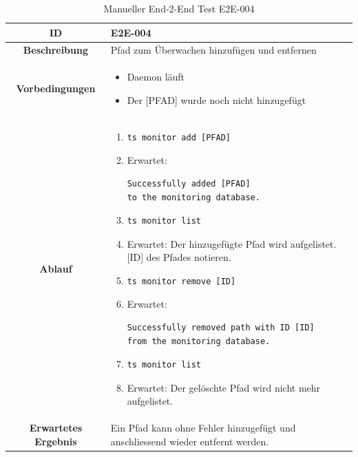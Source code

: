 \documentclass[a4paper,12pt]{report}
\begin{document}
    \begin{table}[h!]
        \centering
        \setlength{\leftmargini}{0.8cm}
        \begin{tabular}{|c|p{10cm}|}
            \hline
            \textbf{ID}                  & E2E-004                                                                         \\ \hline
            \textbf{Beschreibung}        & Pfad zum Überwachen hinzufügen und entfernen                                    \\ \hline
            \textbf{Vorbedingungen} &
            \begin{itemize}
                \item Daemon läuft
                \item  Der [PFAD] wurde noch nicht hinzugefügt
            \end{itemize} \\ \hline
            \textbf{Ablauf} &
            \begin{enumerate}
                \item \begin{verbatim}ts monitor add [PFAD]
                \end{verbatim}
                \item Erwartet: \begin{verbatim}Successfully added [PFAD]
to the monitoring database.
                \end{verbatim}
                \item \begin{verbatim}ts monitor list
                \end{verbatim}
                \item Erwartet: Der hinzugefügte Pfad wird aufgelistet.
                [ID] des Pfades notieren.
                \item \begin{verbatim}ts monitor remove [ID]
                \end{verbatim}
                \item Erwartet: \begin{verbatim}Successfully removed path with ID [ID]
from the monitoring database.
                \end{verbatim}
                \item \begin{verbatim}ts monitor list
                \end{verbatim}
                \item Erwartet: Der gelöschte Pfad wird nicht mehr aufgelistet.
            \end{enumerate} \\ \hline
            \textbf{Erwartetes Ergebnis} & Ein Pfad kann ohne Fehler hinzugefügt und anschliessend wieder entfernt werden. \\ \hline
        \end{tabular}
        \caption{Manueller End-2-End Test E2E-004}\label{tab:e2e-4}
    \end{table}
\end{document}
